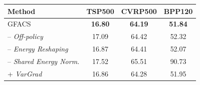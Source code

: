 



\begin{tabular}{lccc}
\toprule[1.0pt]
Method & TSP500 & CVRP500 & BPP120
\\
\midrule
GFACS & \textbf{16.80} & \textbf{64.19} & \textbf{51.84} \\
\quad -- \textit{Off-policy} & 17.09 & 64.42 & 52.32 \\
\quad -- \textit{Energy Reshaping} & 16.87 & 64.41 & 52.07 \\
\quad -- \textit{Shared Energy Norm.} & 17.52 & 65.51 & 90.73 \\
\quad\quad + \textit{VarGrad} & 16.86 & 64.28 & 51.95\\
\bottomrule[1.0pt]
\end{tabular}



